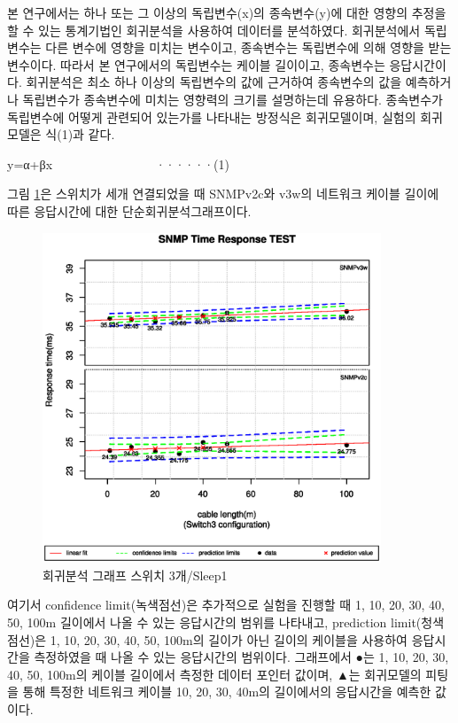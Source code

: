 \documentclass[11pt
  , a4paper
  , article
  , oneside
]{memoir}
\begin{document}
본 연구에서는 하나 또는 그 이상의 독립변수(x)의 종속변수(y)에 대한 영향의 추정을 할 수 있는 통계기법인 회귀분석을 사용하여 데이터를 분석하였다\citep{analysis}. 회귀분석에서 독립변수는 다른 변수에 영향을 미치는 변수이고, 종속변수는 독립변수에 의해 영향을 받는 변수이다. 따라서 본 연구에서의 독립변수는 케이블 길이이고, 종속변수는 응답시간이다. 회귀분석은 최소 하나 이상의 독립변수의 값에 근거하여 종속변수의 값을 예측하거나 독립변수가 종속변수에 미치는 영향력의 크기를 설명하는데 유용하다. 종속변수가 독립변수에 어떻게 관련되어 있는가를 나타내는 방정식은 회귀모델이며, 실험의 회귀모델은 식(1)과 같다. 

y=α+βx　　　　　　　　 ······(1)

그림 \ref{fig:s3s1}은 스위치가 세개 연결되었을 때 SNMPv2c와 v3w의 네트워크 케이블 길이에 따른 응답시간에 대한 단순회귀분석그래프이다. 

\begin{figure}[!htb]
  \centering
  \includegraphics[width=0.9\textwidth]{./images/s3s1.eps}
  \caption{회귀분석 그래프 스위치 3개/Sleep1}
  \label{fig:s3s1}   
\end{figure}

여기서 confidence limit(녹색점선)은 추가적으로 실험을 진행할 때 1, 10, 20, 30, 40, 50, 100m 길이에서 나올 수 있는 응답시간의 범위를 나타내고, prediction limit(청색점선)은 1, 10, 20, 30, 40, 50, 100m의 길이가 아닌 길이의 케이블을 사용하여 응답시간을 측정하였을 때 나올 수 있는 응답시간의 범위이다. 그래프에서 ●는 1, 10, 20, 30, 40, 50, 100m의 케이블 길이에서 측정한 데이터 포인터 값이며, ▲는 회귀모델의 피팅을 통해 특정한 네트워크 케이블 10, 20, 30, 40m의 길이에서의 응답시간을 예측한 값이다. 
\end{document}
